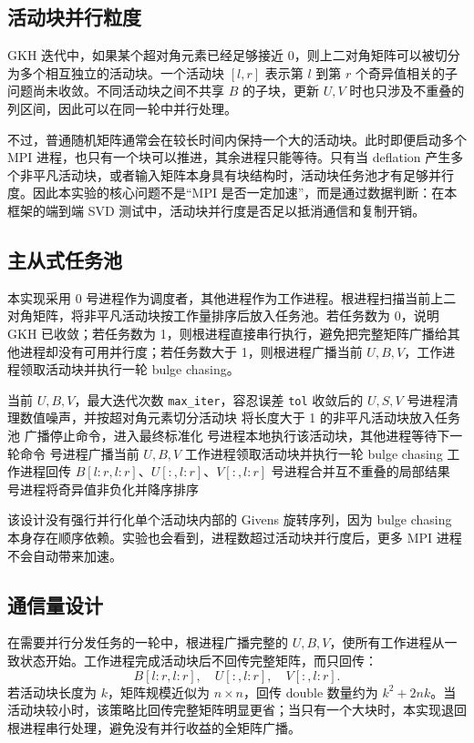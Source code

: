 \documentclass[UTF8,a4paper,10pt,fontset=windows]{ctexart}
\begin{document}
\subsection{活动块并行粒度}
GKH 迭代中，如果某个超对角元素已经足够接近 0，则上二对角矩阵可以被切分为多个相互独立的活动块。一个活动块 $[l,r]$ 表示第 $l$ 到第 $r$ 个奇异值相关的子问题尚未收敛。不同活动块之间不共享 $B$ 的子块，更新 $U,V$ 时也只涉及不重叠的列区间，因此可以在同一轮中并行处理。

不过，普通随机矩阵通常会在较长时间内保持一个大的活动块。此时即便启动多个 MPI 进程，也只有一个块可以推进，其余进程只能等待。只有当 deflation 产生多个非平凡活动块，或者输入矩阵本身具有块结构时，活动块任务池才有足够并行度。因此本实验的核心问题不是“MPI 是否一定加速”，而是通过数据判断：在本框架的端到端 SVD 测试中，活动块并行度是否足以抵消通信和复制开销。

\subsection{主从式任务池}
本实现采用 0 号进程作为调度者，其他进程作为工作进程。根进程扫描当前上二对角矩阵，将非平凡活动块按工作量排序后放入任务池。若任务数为 0，说明 GKH 已收敛；若任务数为 1，则根进程直接串行执行，避免把完整矩阵广播给其他进程却没有可用并行度；若任务数大于 1，则根进程广播当前 $U,B,V$，工作进程领取活动块并执行一轮 bulge chasing。

\begin{algorithm}[H]
\caption{MPI-GKH 活动块任务池}
\begin{algorithmic}[1]
\Require 当前 $U,B,V$，最大迭代次数 \texttt{max\_iter}，容忍误差 \texttt{tol}
\Ensure 收敛后的 $U,S,V$
   号进程清理数值噪声，并按超对角元素切分活动块
  \State 将长度大于 1 的非平凡活动块放入任务池
    \State 广播停止命令，进入最终标准化
     号进程本地执行该活动块，其他进程等待下一轮命令
  \Else
     号进程广播当前 $U,B,V$
    \State 工作进程领取活动块并执行一轮 bulge chasing
    \State 工作进程回传 $B[l:r,l:r]$、$U[:,l:r]$、$V[:,l:r]$
     号进程合并互不重叠的局部结果
  \EndIf
\EndFor
{} 号进程将奇异值非负化并降序排序
\end{algorithmic}
\end{algorithm}

该设计没有强行并行化单个活动块内部的 Givens 旋转序列，因为 bulge chasing 本身存在顺序依赖。实验也会看到，进程数超过活动块并行度后，更多 MPI 进程不会自动带来加速。

\subsection{通信量设计}
在需要并行分发任务的一轮中，根进程广播完整的 $U,B,V$，使所有工作进程从一致状态开始。工作进程完成活动块后不回传完整矩阵，而只回传：
\[
    B[l:r,l:r],\quad U[:,l:r],\quad V[:,l:r].
\]
若活动块长度为 $k$，矩阵规模近似为 $n\times n$，回传 double 数量约为 $k^2+2nk$。当活动块较小时，该策略比回传完整矩阵明显更省；当只有一个大块时，本实现退回根进程串行处理，避免没有并行收益的全矩阵广播。
\end{document}

